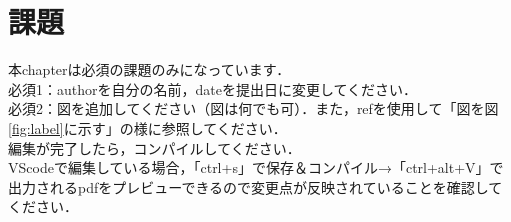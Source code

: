\documentclass[a4paper,10pt]{jsarticle}
\begin{document}
\section{課題}
\noindent 本chapterは必須の課題のみになっています．\\ 
必須1：authorを自分の名前，dateを提出日に変更してください．\\
必須2：図を追加してください（図は何でも可）．また，refを使用して「図を図\ref{fig:label}に示す」の様に参照してください．\\

\noindent 編集が完了したら，コンパイルしてください．\\
VScodeで編集している場合，「ctrl+s」で保存＆コンパイル→「ctrl+alt+V」で出力されるpdfをプレビューできるので変更点が反映されていることを確認してください．
\end{document}
